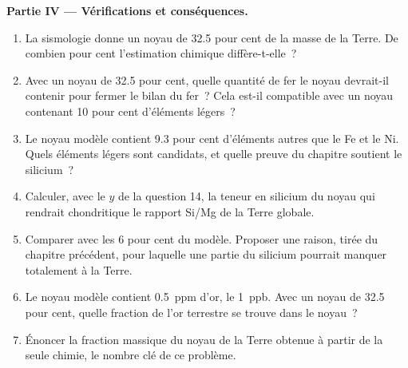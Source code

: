 \begin{problem}
\noindent\textbf{Partie IV --- Vérifications et conséquences.}
\begin{enumerate}[resume]
\item La sismologie donne un noyau de 32.5 pour cent de la masse de la Terre. De combien
pour cent l'estimation chimique diffère-t-elle~?
\item Avec un noyau de 32.5 pour cent, quelle quantité de fer le noyau devrait-il contenir
pour fermer le bilan du fer~? Cela est-il compatible avec un noyau contenant 10 pour cent
d'éléments légers~?
\item Le noyau modèle contient 9.3 pour cent d'éléments autres que le Fe et le Ni. Quels
éléments légers sont candidats, et quelle preuve du chapitre soutient le silicium~?
\item Calculer, avec le $y$ de la question 14, la teneur en silicium du noyau qui rendrait
chondritique le rapport Si/Mg de la Terre globale.
\item Comparer avec les 6 pour cent du modèle. Proposer une raison, tirée du chapitre
précédent, pour laquelle une partie du silicium pourrait manquer totalement à la Terre.
\item Le noyau modèle contient \qty{0.5}{ppm} d'or, le 
\qty{1}{ppb}. Avec un noyau de 32.5 pour cent, quelle fraction de l'or terrestre se trouve
dans le noyau~?
\item Énoncer la fraction massique du noyau de la Terre obtenue à partir de la seule chimie,
le nombre clé de ce problème.
\end{enumerate}
\end{problem}
